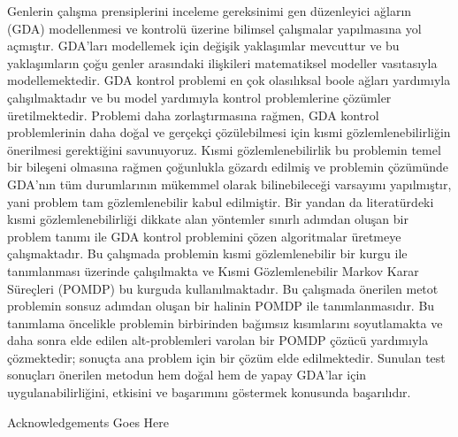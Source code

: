 \documentclass[11pt,oneandhalf,chaparabic]{metu}
\begin{document}
\begin{preliminaries}
\begin{oz} \oneandhalfspacing
Genlerin çalışma prensiplerini inceleme gereksinimi gen düzenleyici ağların (GDA) modellenmesi ve kontrolü
üzerine bilimsel çalışmalar yapılmasına yol açmıştır. GDA'ları modellemek için değişik yaklaşımlar mevcuttur
ve bu yaklaşımların çoğu genler arasındaki ilişkileri matematiksel modeller vasıtasıyla modellemektedir.
GDA kontrol problemi en çok olasılıksal boole ağları yardımıyla çalışılmaktadır ve bu model yardımıyla
kontrol problemlerine çözümler üretilmektedir. Problemi daha zorlaştırmasına rağmen, GDA kontrol problemlerinin
daha doğal ve gerçekçi çözülebilmesi için kısmi gözlemlenebilirliğin önerilmesi gerektiğini savunuyoruz. 
Kısmi gözlemlenebilirlik bu problemin temel bir bileşeni olmasına rağmen çoğunlukla gözardı edilmiş ve
problemin çözümünde GDA'nın tüm durumlarının mükemmel olarak bilinebileceği varsayımı yapılmıştır, yani
problem tam gözlemlenebilir kabul edilmiştir. Bir yandan da literatürdeki kısmi gözlemlenebilirliği
dikkate alan yöntemler sınırlı adımdan oluşan bir problem tanımı ile GDA kontrol problemini çözen algoritmalar
üretmeye çalışmaktadır. Bu çalışmada problemin kısmi gözlemlenebilir bir kurgu ile tanımlanması üzerinde
çalışılmakta ve Kısmi Gözlemlenebilir Markov Karar Süreçleri (POMDP) bu kurguda kullanılmaktadır. Bu çalışmada
önerilen metot problemin sonsuz adımdan oluşan bir halinin POMDP ile tanımlanmasıdır. Bu tanımlama
öncelikle problemin birbirinden bağımsız kısımlarını soyutlamakta ve daha sonra elde edilen alt-problemleri
varolan bir POMDP çözücü yardımıyla çözmektedir; sonuçta ana problem için bir çözüm elde edilmektedir. 
Sunulan test sonuçları önerilen metodun hem doğal hem de yapay GDA'lar için uygulanabilirliğini, etkisini
ve başarımını göstermek konusunda başarılıdır.

\end{oz} 

\dedication{\textit{Dedication Goes Here}}

\setlength{\parindent}{0em}
\setlength{\parskip}{10pt}

\begin{acknowledgments} \oneandhalfspacing
Acknowledgements Goes Here
\end{acknowledgments}
\setlength{\parindent}{0em}
\setlength{\parskip}{3pt}

\tableofcontents
\listoftables
\listoffigures
\end{preliminaries}
   
\setlength{\parindent}{0em}
\setlength{\parskip}{10pt}
\end{document}
